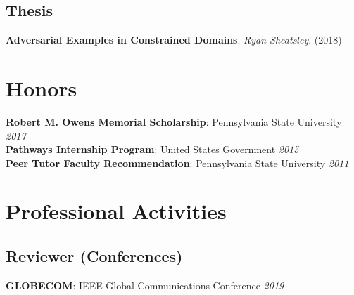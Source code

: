 \documentclass[11pt,a4paper,roman]{moderncv}        %
\begin{document}
\subsection{Thesis}
\textbf{Adversarial Examples in Constrained Domains}. \textit{Ryan Sheatsley}. (2018)

\section{Honors}
\textbf{Robert M. Owens Memorial Scholarship}: Pennsylvania State University \hfill \textit{2017} \\
\textbf{Pathways Internship Program}: United States Government \hfill \textit{2015} \\
\textbf{Peer Tutor Faculty Recommendation}: Pennsylvania State University \hfill \textit{2011} \\

\section{Professional Activities}
\subsection{Reviewer (Conferences)}
\textbf{GLOBECOM}: IEEE Global Communications Conference \hfill \textit{2019}

\nocite{*}



\end{document}
